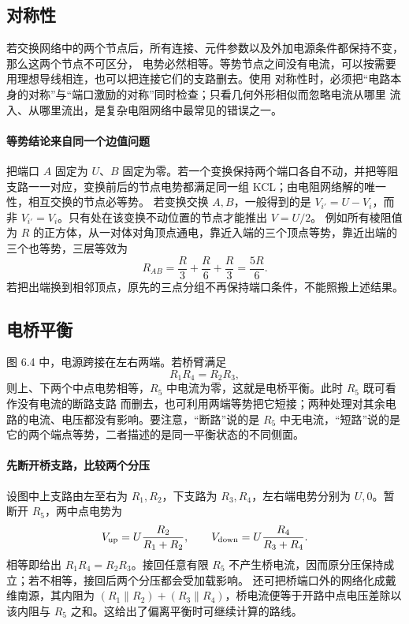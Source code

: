 \subsection*{对称性}

若交换网络中的两个节点后，所有连接、元件参数以及外加电源条件都保持不变，那么这两个节点不可区分，
电势必然相等。等势节点之间没有电流，可以按需要用理想导线相连，也可以把连接它们的支路删去。使用
对称性时，必须把“电路本身的对称”与“端口激励的对称”同时检查；只看几何外形相似而忽略电流从哪里
流入、从哪里流出，是复杂电阻网络中最常见的错误之一。


\paragraph{等势结论来自同一个边值问题}
把端口 $A$ 固定为 $U$、$B$ 固定为零。若一个变换保持两个端口各自不动，并把等阻支路一一对应，变换前后的节点电势都满足同一组 KCL；由电阻网络解的唯一性，相互交换的节点必等势。
若变换交换 $A,B$，一般得到的是 $V_{i'}=U-V_i$，而非 $V_{i'}=V_i$。只有处在该变换不动位置的节点才能推出 $V=U/2$。
例如所有棱阻值为 $R$ 的正方体，从一对体对角顶点通电，靠近入端的三个顶点等势，靠近出端的三个也等势，三层等效为
\[
 R_{AB}=\frac R3+\frac R6+\frac R3=\frac{5R}{6}.
\]
若把出端换到相邻顶点，原先的三点分组不再保持端口条件，不能照搬上述结果。

\subsection*{电桥平衡}

图 6.4 中，电源跨接在左右两端。若桥臂满足
\[
  \boxed{R_1R_4=R_2R_3},
\]
则上、下两个中点电势相等，$R_5$ 中电流为零，这就是电桥平衡。此时 $R_5$ 既可看作没有电流的断路支路
而删去，也可利用两端等势把它短接；两种处理对其余电路的电流、电压都没有影响。要注意，“断路”说的是
$R_5$ 中无电流，“短路”说的是它的两个端点等势，二者描述的是同一平衡状态的不同侧面。

\bridgeFigure
{}


\paragraph{先断开桥支路，比较两个分压}
设图中上支路由左至右为 $R_1,R_2$，下支路为 $R_3,R_4$，左右端电势分别为 $U,0$。暂断开 $R_5$，两中点电势为
\[
 V_{\rm up}=U\frac{R_2}{R_1+R_2},\qquad
 V_{\rm down}=U\frac{R_4}{R_3+R_4}.
\]
相等即给出 $R_1R_4=R_2R_3$。接回任意有限 $R_5$ 不产生桥电流，因而原分压保持成立；若不相等，接回后两个分压都会受加载影响。
还可把桥端口外的网络化成戴维南源，其内阻为
$(R_1\parallel R_2)+(R_3\parallel R_4)$，桥电流便等于开路中点电压差除以该内阻与 $R_5$ 之和。这给出了偏离平衡时可继续计算的路线。

